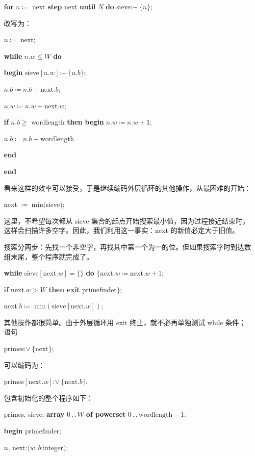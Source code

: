 \quad \textbf{for} $n\coloneq$ next \textbf{step} next \textbf{until} $N$ \textbf{do} sieve:$-\ \{n\}$;

\noindent
改写为：

\quad $n\coloneq$ next;

\quad \textbf{while} $n.w \leqslant W$ \textbf{do}

\quad \quad \textbf{begin} sieve$[n.w]$:$-\ \{n.b\}$;

\quad \quad \quad $n.b\coloneq n.b + \text{next}.b$;

\quad \quad \quad $n.w\coloneq n.w + \text{next}.w;$

\quad \quad \quad \textbf{if} $n.b \geqslant$ wordlength \textbf{then begin} $n.w \coloneq n.w + 1$;

\quad \quad \quad \quad $n.b \coloneq n.b - \text{wordlength}$

\quad \quad \quad \textbf{end}

\quad \quad \textbf{end}

\noindent
看来这样的效率可以接受，于是继续编码外层循环的其他操作，从最困难的开始：

\quad next $\coloneq$ min$($sieve$)$;

\noindent
这里，不希望每次都从 sieve 集合的起点开始搜索最小值，因为过程接近结束时，这样会扫描许多空字。因此，我们利用这一事实：next 的新值必定大于旧值。

搜索分两步：先找一个非空字，再找其中第一个为一的位。但如果搜索字时到达数组末尾，整个程序就完成了。

\quad \textbf{while} sieve$[\text{next}.w] = \{\}$ \textbf{do} $\{\text{next}.w \coloneq \text{next}.w +1$;

\quad \quad \textbf{if} next.$w > W$ \textbf{then exit} primefinder$\}$;

\quad \quad next.$b\coloneq$ min$(\text{sieve}[\text{next}.w])$;

其他操作都很简单。由于外层循环用 exit 终止，就不必再单独测试 while 条件；语句

\quad primes:$\vee\ \{$next$\}$;

\noindent
可以编码为：

\quad primes$[\text{next}.w]$:$\vee\ \{\text{next}.b\}$.

包含初始化的整个程序如下：

\quad primes, sieve: \textbf{array} $0\,.\,.\,W$ \textbf{of powerset} $0\,.\,.\,\text{wordlength} - 1$;

\quad \textbf{begin} primefinder;

\quad \quad $n$, next:$(w, b$:integer$)$;

